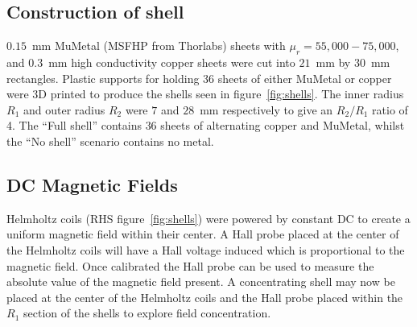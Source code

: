 \documentclass[11pt]{iopart}
\begin{document}
\subsection{Construction of shell}
$0.15$~mm MuMetal (MSFHP from Thorlabs) sheets with $\mu_r = 55,000 - 75,000$, and $0.3$~mm high conductivity copper sheets were cut
into $21$~mm by $30$~mm rectangles.  Plastic supports for
holding $36$ sheets of either MuMetal or copper were 3D printed to
produce the shells seen in figure~\ref{fig:shells}. The inner radius
$R_1$ and outer radius $R_2$ were $7$ and $28$~mm respectively to give
an $R_2/R_1$ ratio of 4. The ``Full shell'' contains $36$ sheets of
alternating copper and MuMetal, whilst the ``No shell'' scenario
contains no metal. 

\subsection{DC Magnetic Fields}
Helmholtz coils (RHS figure~\ref{fig:shells}) were powered by constant
DC to create a uniform magnetic field within their
center.
A Hall probe placed at the center of the Helmholtz coils will have a
Hall voltage induced which is proportional to the magnetic field. Once
calibrated the Hall probe can be used to measure the absolute value of
the magnetic field present. A concentrating shell may now be placed at
the center of the Helmholtz coils and the Hall probe placed within the
$R_1$ section of the shells to explore field concentration.

\end{document}
